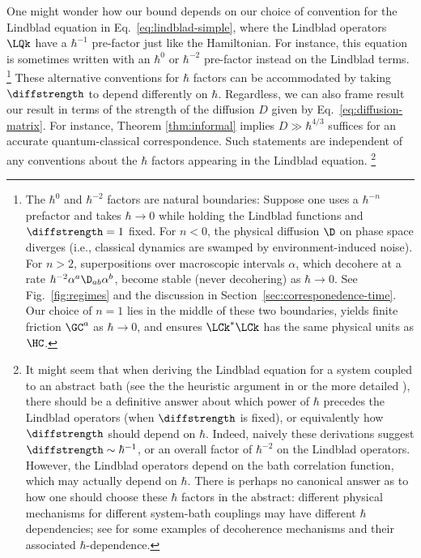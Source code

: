 \documentclass{article}
\numberwithin{equation}{section}
\begin{document}
One might wonder how our bound depends on our choice of convention for the Lindblad equation in Eq.~\eqref{eq:lindblad-simple}, where the Lindblad operators $\LQk$ have a $\hbar^{-1}$ pre-factor just like the Hamiltonian.  For instance, this equation is sometimes written with an $\hbar^0$ or $\hbar^{-2}$ pre-factor instead on the Lindblad terms.
\footnote{The $\hbar^0$ and $\hbar^{-2}$ factors are natural boundaries: Suppose one uses a $\hbar^{-n}$ prefactor and takes $\hbar\to 0$ while holding the Lindblad functions and $\diffstrength=1$ fixed. For $n<0$, the physical diffusion $\D$ on phase space diverges (i.e., classical dynamics are swamped by environment-induced noise). For $n>2$, superpositions over macroscopic intervals $\alpha$, which decohere at a rate $\hbar^{-2} \alpha^a \D_{ab}\alpha^b$, become stable (never decohering) as $\hbar\to 0$. See Fig.~\ref{fig:regimes} and the discussion in Section~\ref{sec:corresponedence-time}. Our choice of $n=1$ lies in the middle of these two boundaries, yields finite friction $\GC^a$ as $\hbar\to 0$, and ensures $\LCk^*\LCk$ has the same physical units as $\HC$.}
These alternative conventions for $\hbar$ factors can be accommodated by taking $\diffstrength$ to depend differently on $\hbar$.  Regardless, we can also frame result our result in terms of the strength of the diffusion $D$ given by Eq.~\eqref{eq:diffusion-matrix}.  For instance, Theorem \ref{thm:informal} implies $D \gg \hbar^{4/3}$ suffices for an accurate quantum-classical correspondence. Such statements are independent of any conventions about the $\hbar$ factors appearing in the Lindblad equation.
\footnote{\label{fn:no-correct-scaling}It might seem that when deriving the Lindblad equation for a system coupled to an abstract bath (see the the heuristic argument in \cite{manzano2020short} or the more detailed \cite{nathan2020universal}), there should be a definitive answer about which power of $\hbar$ precedes the Lindblad operators (when $\diffstrength$ is fixed), or equivalently how $\diffstrength$ should depend on $\hbar$. Indeed, naively these derivations suggest $\diffstrength \sim \hbar^{-1}$, or an overall factor of $\hbar^{-2}$ on the Lindblad operators.  However, the Lindblad operators depend on the bath correlation function, which may actually depend on $\hbar$.  There is perhaps no canonical answer as to how one should choose these $\hbar$ factors in the abstract: different physical mechanisms for different system-bath couplings may have different $\hbar$ dependencies; see \cite{joos2013decoherence} for some examples of decoherence mechanisms and their associated $\hbar$-dependence.}
\end{document}
